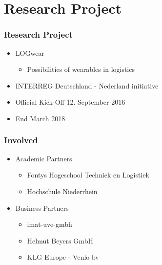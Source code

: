 \section{Research Project}
\begin{frame}\frametitle{Research Project}
	\begin{itemize}
		\item LOGwear
		\begin{itemize}
			\item Possibilities of wearables in logistics
		\end{itemize}
		\item INTERREG Deutschland - Nederland initiative
		\item Official Kick-Off 12. September 2016
		\item End March 2018
	\end{itemize}
\end{frame}
\begin{frame}\frametitle{Involved}
\begin{itemize}

	\item Academic Partners
	\begin{itemize}
		\item Fontys Hogeschool Techniek en Logistiek
		\item Hochschule Niederrhein
	\end{itemize}
	\item Business Partners
	\begin{itemize}
		\item imat-uve-gmbh
		\item Helmut Beyers GmbH
		\item KLG Europe - Venlo bv %
	\end{itemize}
	\end{itemize}
\end{frame}